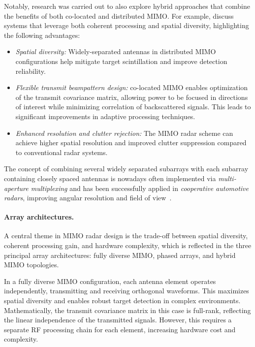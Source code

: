 Notably, research was carried out to also explore hybrid approaches that combine the benefits of both co-located and distributed MIMO.
For example, \textcite{xuIterativeGeneralizedLikelihoodRatio2007} discuss systems that leverage both coherent processing and spatial diversity, highlighting the following advantages:
\begin{itemize}
    \item \emph{Spatial diversity:} Widely-separated antennas in distributed MIMO configurations help mitigate target scintillation and improve detection reliability.
    \item \emph{Flexible transmit beampattern design:} co-located MIMO enables optimization of the transmit covariance matrix, allowing power to be focused in directions of interest while minimizing correlation of backscattered signals.
    This leads to significant improvements in adaptive processing techniques.
    \item \emph{Enhanced resolution and clutter rejection:} The MIMO radar scheme can achieve higher spatial resolution and improved clutter suppression compared to conventional radar systems.
\end{itemize}

The concept of combining several widely separated subarrays with each subarray containing closely spaced antennas is nowadays often implemented via \emph{multi-aperture multiplexing} and has been successfully applied in \emph{cooperative automotive radars}, improving angular resolution and field of view~\parencite{liangCooperativeAutomotiveRadars2022}.

\paragraph{Array architectures.}
A central theme in MIMO radar design is the trade-off between spatial diversity, coherent processing gain, and hardware complexity, which is reflected in the three principal array architectures: fully diverse MIMO, phased arrays, and hybrid MIMO topologies.

In a fully diverse MIMO configuration, each antenna element operates independently, transmitting and receiving orthogonal waveforms.
This maximizes spatial diversity and enables robust target detection in complex environments.
Mathematically, the transmit covariance matrix in this case is full-rank, reflecting the linear independence of the transmitted signals.
However, this requires a separate RF processing chain for each element, increasing hardware cost and complexity.

